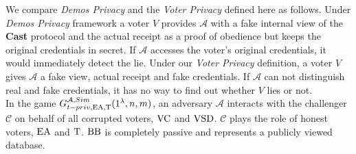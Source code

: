 We compare \textit{Demos Privacy} and the \textit{Voter Privacy} defined here as follows. Under \textit{Demos Privacy} framework a voter $V$ provides $\mathcal{A}$  with a fake internal view of the \textbf{Cast} protocol and the actual receipt as a proof of obedience but keeps the original credentials in secret. If $\mathcal{A}$ accesses the voter's original credentials, it would immediately detect the lie. Under our \textit{Voter Privacy} definition, a voter $V$ gives $\mathcal{A}$ a fake view, actual receipt and fake credentials. If $\mathcal{A}$ can not distinguish real and fake credentials, it has no way to find out whether $V$ lies or not. \\
 
In the game $G_{t-priv,\operatorname{EA},\operatorname{T}}^{\mathcal{A}, Sim}(1^{\lambda},n,m)$, an adversary $\mathcal{A}$ interacts with the challenger $\mathcal{C}$ on behalf of all corrupted voters, $\operatorname{VC}$ and $\operatorname{VSD}$. $\mathcal{C}$ plays the role of honest voters, $\operatorname{EA}$ and $\operatorname{T}$. $\operatorname{BB}$ is completely passive and represents a publicly viewed database. \\

